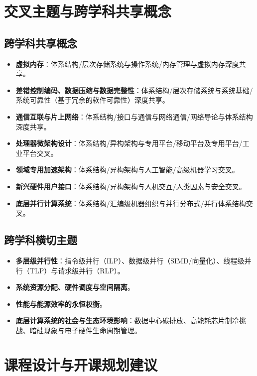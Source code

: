 \section{交叉主题与跨学科共享概念}

\subsection{跨学科共享概念}
\begin{itemize}
    \item \textbf{虚拟内存}：体系结构/层次存储系统与操作系统/内存管理与虚拟内存深度共享。
    \item \textbf{差错控制编码、数据压缩与数据完整性}：体系结构/层次存储系统与系统基础/系统可靠性（基于冗余的软件可靠性）深度共享。
    \item \textbf{通信互联与片上网络}：体系结构/接口与通信与网络通信/网络导论与体系结构深度共享。
    \item \textbf{处理器微架构设计}：体系结构/异构架构与专用平台/移动平台及专用平台/工业平台交叉。
    \item \textbf{领域专用加速架构}：体系结构/异构架构与人工智能/高级机器学习交叉。
    \item \textbf{新兴硬件用户接口}：体系结构/异构架构与人机交互/人类因素与安全交叉。
    \item \textbf{底层并行计算系统}：体系结构/汇编级机器组织与并行分布式/并行体系结构交叉。
\end{itemize}

\subsection{跨学科横切主题}
\begin{itemize}
    \item \textbf{多层级并行性}：指令级并行（ILP）、数据级并行（SIMD/向量化）、线程级并行（TLP）与请求级并行（RLP）。
    \item \textbf{系统资源分配、硬件调度与空间隔离}。
    \item \textbf{性能与能源效率的永恒权衡}。
    \item \textbf{底层计算系统的社会与生态环境影响}：数据中心碳排放、高能耗芯片制冷挑战、暗硅现象与电子硬件生命周期管理。
\end{itemize}

\section{课程设计与开课规划建议}

